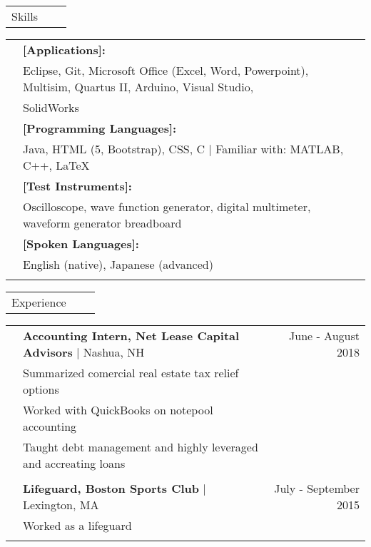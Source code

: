 \documentclass[letterpaper,10pt,oneside]{article}
\begin{document}
 \noindent \begin{tabularx}{\linewidth}{@{} l l R } 
     \Large{Skills}\\
 \end{tabularx}
 \noindent \begin{tabularx}{\linewidth}{@{} l l l }
     &\textbf{[Applications]:}\\
     &Eclipse, Git, Microsoft Office (Excel, Word, Powerpoint), Multisim, Quartus II, Arduino, Visual Studio,\\
     &SolidWorks\\
     &\textbf{[Programming Languages]:}\\
     &Java, HTML (5, Bootstrap), CSS, C $\mid$ Familiar with: MATLAB, C++, \LaTeX  \\
     &\textbf{[Test Instruments]:}\\
     &Oscilloscope, wave function generator, digital multimeter, waveform generator breadboard\\
     &\textbf{[Spoken Languages]:}\\
     &English (native), Japanese (advanced) \\
     \\
 \end{tabularx}

 \noindent \begin{tabularx}{\linewidth}{@{} l l R }
     \Large{Experience}\\
 \end{tabularx}     
 \noindent \begin{tabularx}{\linewidth}{@{} l l R }     
     & \textbf{Accounting Intern, Net Lease Capital Advisors} $\mid$ Nashua, NH & June - August 2018 \\
     &Summarized comercial real estate tax relief options\\
     &Worked with QuickBooks on notepool accounting\\
     &Taught debt management and highly leveraged and accreating loans\\
     & \\
     &\textbf{Lifeguard, Boston Sports Club} $\mid$ Lexington, MA & July - September 2015 \\
     &Worked as a lifeguard  \\
     \\
 \end{tabularx}     


\newpage

\end{document}
